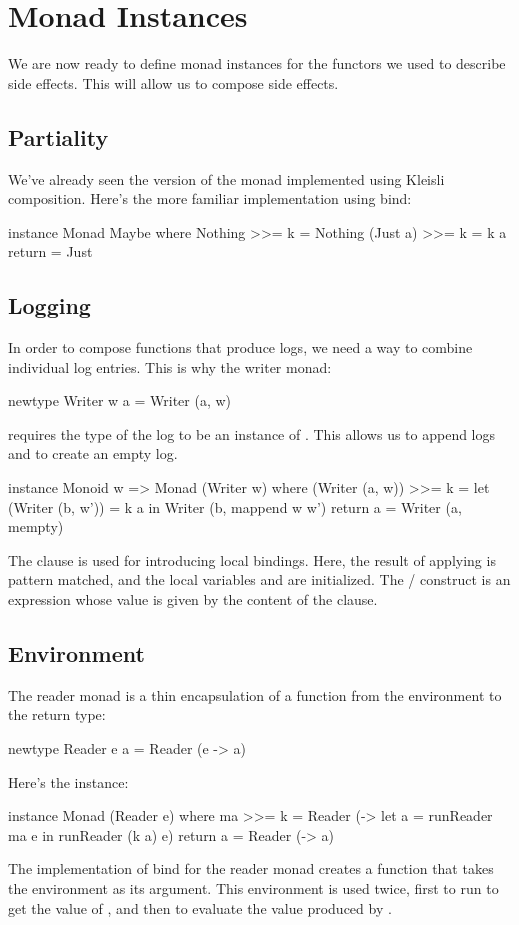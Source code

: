 \documentclass[DaoFP]{subfiles}
\begin{document}
\section{Monad Instances}

We are now ready to define monad instances for the functors we used to describe side effects. This will allow us to compose side effects.

\subsection{Partiality}
We've already seen the version of the  monad implemented using Kleisli composition. Here's the more familiar implementation using bind:
\begin{haskell}
instance Monad Maybe where
  Nothing >>= k = Nothing
  (Just a) >>= k = k a
  return = Just
\end{haskell}

\subsection{Logging}
In order to compose functions that produce logs, we need a way to combine individual log entries. This is why the writer monad:
\begin{haskell}
newtype Writer w a = Writer (a, w)
\end{haskell}
requires the type of the log to be an instance of . This allows us to append logs and to create an empty log.
\begin{haskell}
instance Monoid w => Monad (Writer w) where
  (Writer (a, w)) >>= k = let (Writer (b, w')) = k a
                          in Writer (b, mappend w w')
  return a = Writer (a, mempty)
\end{haskell}
The  clause is used for introducing local bindings. Here, the result of applying  is pattern matched, and the local variables  and  are initialized. The / construct is an expression whose value is given by the content of the  clause.

\subsection{Environment}

The reader monad is a thin encapsulation of a function from the environment to the return type:
\begin{haskell}
newtype Reader e a = Reader (e -> a)
\end{haskell}
Here's the  instance:
\begin{haskell}
instance Monad (Reader e) where
  ma >>= k = Reader (\e -> let a = runReader ma e
                           in runReader (k a) e)
  return a = Reader (\e -> a)
\end{haskell}
The implementation of bind for the reader monad creates a function that takes the environment as its argument. This environment is used twice, first to run  to get the value of , and then to evaluate the value produced by .
\end{document}
